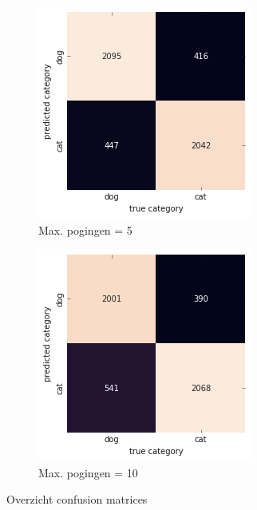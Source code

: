 \begin{figure}[b!]
    \begin{subfigure}{0.5\textwidth}
        \centering
        \includegraphics[width=0.8\linewidth]{img/autokeras-5-confusion.png}
        \caption{Max. pogingen = 5}
        \label{fig:confusion-autokeras-5}
    \end{subfigure}
    \begin{subfigure}{0.5\textwidth}
        \centering
        \includegraphics[width=0.8\linewidth]{img/autokeras-10-confusion.png}
        \caption{Max. pogingen = 10}
        \label{fig:confusion-autokeras-10}
    \end{subfigure}
    \caption{Overzicht confusion matrices}
    \label{fig:confusion-matrices-autokeras}
\end{figure}

